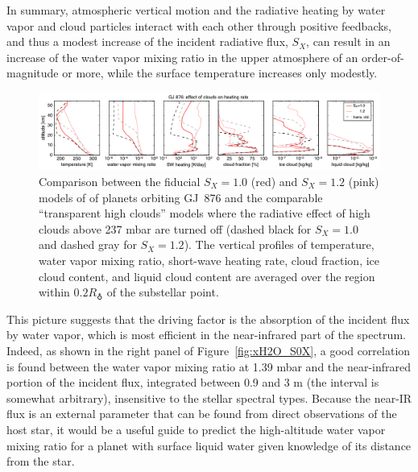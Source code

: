 \documentclass[11pt,numberedappendix,twocolappendix,]{emulateapj}
\def\water{H$_2$O}
\def\preslevel{1.39 mbar}
\def\wv{water vapor}
\begin{document}
In summary, atmospheric vertical motion and the radiative heating by water vapor and cloud particles interact with each other through positive feedbacks, and thus a modest increase of the incident radiative flux, $S_X$, can result in  an increase of the \wv{} mixing ratio in the upper atmosphere of an order-of-magnitude or more, while the surface temperature increases only modestly. 


\begin{figure}[htb]
    \begin{center}
    \includegraphics[width=1\hsize]{GJ876_heat_cld.pdf}
    \end{center}
\caption{Comparison between the fiducial $S_X=1.0$ (red) and $S_X=1.2$ (pink) models of of planets orbiting GJ~876 and the comparable ``transparent high clouds'' models where the radiative effect of high clouds above 237 mbar are turned off (dashed black for $S_X=1.0$ and dashed gray for $S_X=1.2$). The vertical profiles of temperature, \wv{} mixing ratio, short-wave heating rate, cloud fraction, ice cloud content, and liquid cloud content are averaged over the region within $0.2R_\earth $ of the substellar point. }
\label{fig:GJ876_heat_cld}
\end{figure}

This picture suggests that the driving factor is the absorption of the incident flux by water vapor, which is most efficient in the near-infrared part of the spectrum. 
Indeed, as shown in the right panel of Figure~\ref{fig:xH2O_S0X}, a good correlation is found between the \wv{} mixing ratio at \preslevel{} and the near-infrared portion of the incident flux, integrated between 0.9 and 3 \textmu m (the interval is somewhat arbitrary), insensitive to the stellar spectral types. 
Because the near-IR flux is an external parameter that can be found from direct observations of the host star, it would be a useful guide to predict the high-altitude \wv{}  mixing ratio for a planet with surface liquid water given knowledge of its distance from the star. 
\end{document}
